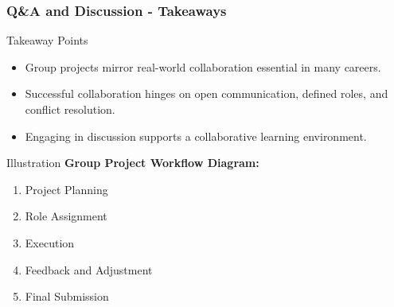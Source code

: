 \documentclass[aspectratio=169]{beamer}
\begin{document}
\begin{frame}[fragile]
    \frametitle{Q\&A and Discussion - Takeaways}
    \begin{block}{Takeaway Points}
        \begin{itemize}
            \item Group projects mirror real-world collaboration essential in many careers.
            \item Successful collaboration hinges on open communication, defined roles, and conflict resolution.
            \item Engaging in discussion supports a collaborative learning environment.
        \end{itemize}
    \end{block}
    \begin{block}{Illustration}
        \textbf{Group Project Workflow Diagram:}
        \begin{enumerate}
            \item Project Planning
            \item Role Assignment
            \item Execution
            \item Feedback and Adjustment
            \item Final Submission
        \end{enumerate}
    \end{block}
\end{frame}
\end{document}
